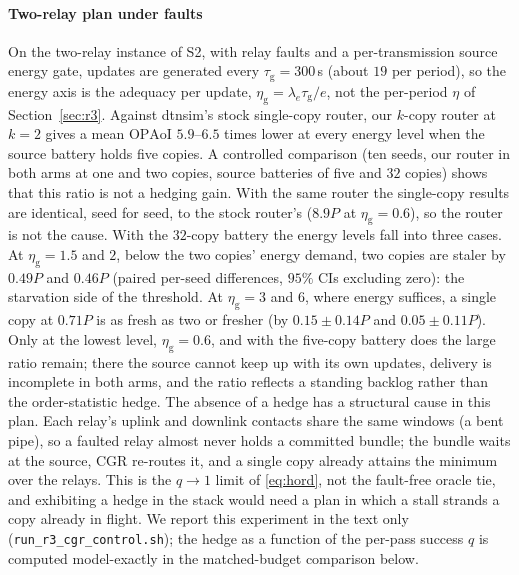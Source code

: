 \documentclass[twocolumn,3p,times,procedia]{elsarticle}
\theoremstyle{plain}
\theoremstyle{remark}
\newcommand{\OPAoI}{\mathrm{OPAoI}}
\newcommand{\GEN}{\tau_{\mathrm{g}}}
\begin{document}
\paragraph*{Two-relay plan under faults}
On the two-relay instance of S2, with relay faults and a
per-transmission source energy gate, updates are generated every
$\GEN{=}300$\,s (about $19$ per period), so the energy axis is the
adequacy per update, $\eta_{\mathrm{g}}=\lambda_e\GEN/e$, not the
per-period $\eta$ of Section~\ref{sec:r3}. Against dtnsim's stock
single-copy router, our $k$-copy router at $k{=}2$ gives a mean $\OPAoI$
$5.9$--$6.5$ times lower at every energy level when the source battery
holds five copies. A controlled comparison (ten seeds, our router in
both arms at one and two copies, source batteries of five and $32$
copies) shows that this ratio is not a hedging gain. With the same
router the single-copy results are identical, seed for seed, to the
stock router's ($8.9P$ at $\eta_{\mathrm{g}}{=}0.6$), so the router is
not the cause. With the $32$-copy battery the energy levels fall into
three cases. At $\eta_{\mathrm{g}}{=}1.5$ and $2$, below the two copies'
energy demand, two copies are staler by $0.49P$ and $0.46P$ (paired
per-seed differences, $95\%$ CIs excluding zero): the starvation side
of the threshold. At $\eta_{\mathrm{g}}{=}3$ and $6$, where energy
suffices, a single copy at $0.71P$ is as fresh as two or fresher (by
$0.15\pm0.14P$ and $0.05\pm0.11P$). Only at the lowest level,
$\eta_{\mathrm{g}}{=}0.6$, and with the five-copy battery does the large
ratio remain; there the source cannot keep up with its own updates,
delivery is incomplete in both arms, and the ratio reflects a standing
backlog rather than the order-statistic hedge. The absence of a hedge
has a structural cause in this plan. Each relay's uplink and downlink
contacts share the same windows (a bent pipe), so a faulted relay
almost never holds a committed bundle; the bundle waits at the source,
CGR re-routes it, and a single copy already attains the minimum over
the relays. This is the $q\to1$ limit of \eqref{eq:hord}, not the
fault-free oracle tie, and exhibiting a hedge in the stack would need a
plan in which a stall strands a copy already in flight. We report this
experiment in the text only (\texttt{run\_r3\_cgr\_control.sh}); the
hedge as a function of the per-pass success $q$ is computed
model-exactly in the matched-budget comparison below.
\end{document}
